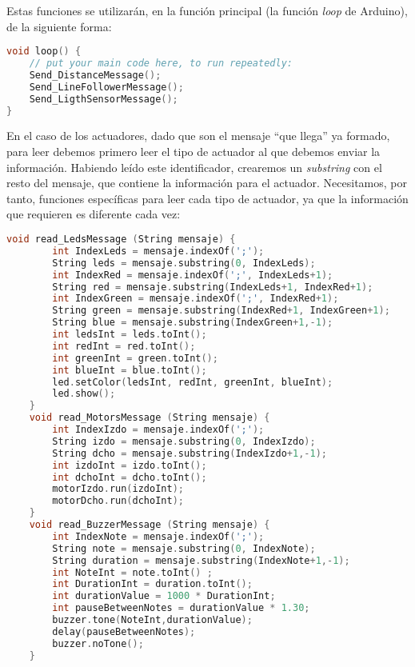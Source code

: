 Estas funciones se utilizarán, en la función principal (la función \textit{loop} de Arduino), de la siguiente forma:

\begin{lstlisting}[language=C,caption={Uso de las funciones para enviar la información de los sensores al programa PC}]
void loop() {
	// put your main code here, to run repeatedly:
	Send_DistanceMessage();
	Send_LineFollowerMessage(); 
	Send_LigthSensorMessage();
}
\end{lstlisting}


En el caso de los actuadores, dado que son el mensaje ``que llega'' ya formado, para leer debemos primero leer el tipo de actuador al que debemos enviar la información. Habiendo leído este identificador, crearemos un \textit{substring} con el resto del mensaje, que contiene la información para el actuador. Necesitamos, por tanto, funciones específicas para leer cada tipo de actuador, ya que la información que requieren es diferente cada vez:

\begin{lstlisting}[language=C,caption={Lectura de mensajes de los actuadores}]
	void read_LedsMessage (String mensaje) {
		int IndexLeds = mensaje.indexOf(';');
		String leds = mensaje.substring(0, IndexLeds);
		int IndexRed = mensaje.indexOf(';', IndexLeds+1); 
		String red = mensaje.substring(IndexLeds+1, IndexRed+1);
		int IndexGreen = mensaje.indexOf(';', IndexRed+1);
		String green = mensaje.substring(IndexRed+1, IndexGreen+1);
		String blue = mensaje.substring(IndexGreen+1,-1); 
		int ledsInt = leds.toInt();
		int redInt = red.toInt();
		int greenInt = green.toInt();
		int blueInt = blue.toInt();
		led.setColor(ledsInt, redInt, greenInt, blueInt);
		led.show();
	}	
	void read_MotorsMessage (String mensaje) {
		int IndexIzdo = mensaje.indexOf(';');
		String izdo = mensaje.substring(0, IndexIzdo);
		String dcho = mensaje.substring(IndexIzdo+1,-1);	
		int izdoInt = izdo.toInt();
		int dchoInt = dcho.toInt();
		motorIzdo.run(izdoInt);
		motorDcho.run(dchoInt);
	}
	void read_BuzzerMessage (String mensaje) {
		int IndexNote = mensaje.indexOf(';');
		String note = mensaje.substring(0, IndexNote);  
		String duration = mensaje.substring(IndexNote+1,-1);
		int NoteInt = note.toInt() ;
		int DurationInt = duration.toInt();	
		int durationValue = 1000 * DurationInt;  
		int pauseBetweenNotes = durationValue * 1.30;
		buzzer.tone(NoteInt,durationValue);
		delay(pauseBetweenNotes);
		buzzer.noTone();
	}	
\end{lstlisting}

